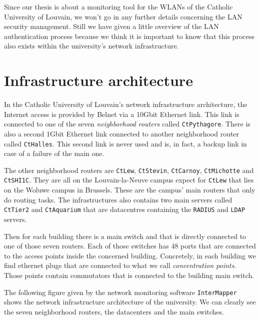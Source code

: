 Since our thesis is about a monitoring tool for the WLANs of the Catholic University of Louvain, we won't go in any further details concerning the LAN security management. 
Still we have given a little overview of the LAN authentication process because we think it is important to know that this process also exists within the university's network infrastructure.


\section{Infrastructure architecture}
In the Catholic University of Louvain's network infrastructure architecture, the Internet access is provided by Belnet via a 10Gbit Ethernet link. This link is connected to one of the seven \textit{neighborhood routers} called \texttt{CtPythagore}. There is also a second 1Gbit Ethernet link connected to another neighborhood router called \texttt{CtHalles}. This second link is never used and is, in fact, a backup link in case of a failure of the main one.

The other neighborhood routers are \texttt{CtLew}, \texttt{CtStevin}, \texttt{CtCarnoy}, \texttt{CtMichotte} and \texttt{CtSHI1C}. They are all on the Louvain-la-Neuve campus expect for \texttt{CtLew} that lies on the Woluwe campus in Brussels. These are the campus' main routers that only do routing tasks.
The infrastructures also contains two main servers called \texttt{CtTier2} and \texttt{CtAquarium} that are datacentres containing the \texttt{RADIUS} and \texttt{LDAP} servers.

Then for each building there is a main switch and that is directly connected to one of those seven routers. Each of those switches has 48 ports that are connected to the access points inside the concerned building.
Concretely, in each building we find ethernet plugs that are connected to what we call \textit{concentration points}. Those points contain commutators that is connected to the building main switch.

The following figure given by the network monitoring software \texttt{InterMapper}\cite{intermapper} shows the network infrastructure architecture of the university. We can clearly see the seven neighborhood routers, the datacenters and the main switches.

